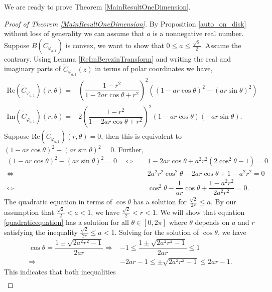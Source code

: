 \documentclass{amsart}
\theoremstyle{remark}
\begin{document}
We are ready to prove Theorem \ref{MainResultOneDimension}. 
\begin{proof}[Proof of Theorem \ref{MainResultOneDimension}]
By Proposition \ref{auto_on_disk} without loss of generality we can assume that $a$ is a nonnegative real number.
Suppose $B(C_{\varphi_{a,1}})$ is convex, we want to show that $0\leq a \leq \frac{\sqrt{2}}{2}$.
Assume the contrary. Using Lemma \ref{ReImBerezinTransform} and writing the real and imaginary parts of $\widetilde{C}_{\varphi_{a,1}}(z)$ in terms of polar coordinates we have,
\begin{align} 
\mathrm{Re}(\widetilde{C}_{\varphi_{a,1}})(r,\theta)=&\left(\dfrac{1-r^2}{1-2ar\cos\theta+r^2} \right)^2\left(\left(1-ar\cos\theta \right)^2-\left(ar\sin\theta\right)^2 \right) \label{polarform}  \\
\mathrm{Im}(\widetilde{C}_{\varphi_{a,1}})(r,\theta)=&2\left(\dfrac{1-r^2}{1-2ar\cos\theta+r^2} \right)^2\left(1-ar\cos\theta \right)\left(-ar\sin\theta\right). \nonumber
\end{align}
Suppose $\mathrm{Re}(\widetilde{C}_{\varphi_{a,1}})(r,\theta)=0$, then this is equivalent to $\left(1-ar\cos\theta \right)^2-\left(ar\sin\theta\right)^2 =0$. Further, 
\begin{align}
 \left(1-ar\cos\theta \right)^2-\left(ar\sin\theta\right)^2=0 \quad 
 \Leftrightarrow& \quad 1-2ar\cos\theta+a^2r^2(2\cos^2\theta-1)=0 \nonumber \\
 \Leftrightarrow& \quad 2a^2r^2\cos^2\theta-2ar\cos\theta+1-a^2r^2=0 \nonumber \\
 \Leftrightarrow& \quad \cos^2\theta-\dfrac{1}{ar}\cos\theta+\dfrac{1-a^2r^2}{2a^2r^2}=0. \label{quadraticequation}
\end{align}
The quadratic equation in terms of $\cos \theta$ has a solution for $ \frac{\sqrt{2}}{2r}\leq a.$ By our assumption that $\frac{\sqrt{2}}{2}<a<1$, we have $\frac{\sqrt{2}}{2}<r<1$. We will show that equation \eqref{quadraticequation} has a solution for all $\theta \in [0,2\pi]$ where $\theta$ depends on $a$ and $r$ satisfying the inequality $\frac{\sqrt{2}}{2r} \leq a < 1.$ Solving for the solution of $\cos \theta$, we have 
\begin{align*}
\cos \theta = \dfrac{1 \pm \sqrt{2a^2r^2-1}}{2ar} \Rightarrow& -1 \leq \dfrac{1 \pm \sqrt{2a^2r^2-1}}{2ar} \leq 1 \\
\Rightarrow& -2ar-1 \leq \pm \sqrt{2a^2r^2-1} \leq 2ar-1.
\end{align*}
This indicates that both inequalities  
\begin{align}\label{inequality1}

\end{align}
\end{proof}
\end{document}
